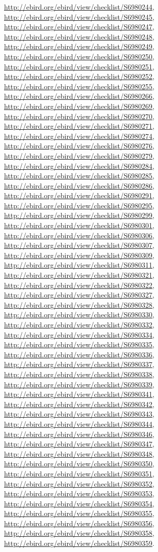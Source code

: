 \documentclass[9pt, article]{memoir}
\begin{document}
\begin{multicols}{2}
\url{http://ebird.org/ebird/view/checklist/S6980244}, 
\url{http://ebird.org/ebird/view/checklist/S6980245}, 
\url{http://ebird.org/ebird/view/checklist/S6980247}, 
\url{http://ebird.org/ebird/view/checklist/S6980248}, 
\url{http://ebird.org/ebird/view/checklist/S6980249}, 
\url{http://ebird.org/ebird/view/checklist/S6980250}, 
\url{http://ebird.org/ebird/view/checklist/S6980251}, 
\url{http://ebird.org/ebird/view/checklist/S6980252}, 
\url{http://ebird.org/ebird/view/checklist/S6980255}, 
\url{http://ebird.org/ebird/view/checklist/S6980266}, 
\url{http://ebird.org/ebird/view/checklist/S6980269}, 
\url{http://ebird.org/ebird/view/checklist/S6980270}, 
\url{http://ebird.org/ebird/view/checklist/S6980271}, 
\url{http://ebird.org/ebird/view/checklist/S6980274}, 
\url{http://ebird.org/ebird/view/checklist/S6980276}, 
\url{http://ebird.org/ebird/view/checklist/S6980279}, 
\url{http://ebird.org/ebird/view/checklist/S6980284}, 
\url{http://ebird.org/ebird/view/checklist/S6980285}, 
\url{http://ebird.org/ebird/view/checklist/S6980286}, 
\url{http://ebird.org/ebird/view/checklist/S6980291}, 
\url{http://ebird.org/ebird/view/checklist/S6980295}, 
\url{http://ebird.org/ebird/view/checklist/S6980299}, 
\url{http://ebird.org/ebird/view/checklist/S6980301}, 
\url{http://ebird.org/ebird/view/checklist/S6980306}, 
\url{http://ebird.org/ebird/view/checklist/S6980307}, 
\url{http://ebird.org/ebird/view/checklist/S6980309}, 
\url{http://ebird.org/ebird/view/checklist/S6980311}, 
\url{http://ebird.org/ebird/view/checklist/S6980321}, 
\url{http://ebird.org/ebird/view/checklist/S6980322}, 
\url{http://ebird.org/ebird/view/checklist/S6980327}, 
\url{http://ebird.org/ebird/view/checklist/S6980328}, 
\url{http://ebird.org/ebird/view/checklist/S6980330}, 
\url{http://ebird.org/ebird/view/checklist/S6980332}, 
\url{http://ebird.org/ebird/view/checklist/S6980334}, 
\url{http://ebird.org/ebird/view/checklist/S6980335}, 
\url{http://ebird.org/ebird/view/checklist/S6980336}, 
\url{http://ebird.org/ebird/view/checklist/S6980337}, 
\url{http://ebird.org/ebird/view/checklist/S6980338}, 
\url{http://ebird.org/ebird/view/checklist/S6980339}, 
\url{http://ebird.org/ebird/view/checklist/S6980341}, 
\url{http://ebird.org/ebird/view/checklist/S6980342}, 
\url{http://ebird.org/ebird/view/checklist/S6980343}, 
\url{http://ebird.org/ebird/view/checklist/S6980344}, 
\url{http://ebird.org/ebird/view/checklist/S6980346}, 
\url{http://ebird.org/ebird/view/checklist/S6980347}, 
\url{http://ebird.org/ebird/view/checklist/S6980348}, 
\url{http://ebird.org/ebird/view/checklist/S6980350}, 
\url{http://ebird.org/ebird/view/checklist/S6980351}, 
\url{http://ebird.org/ebird/view/checklist/S6980352}, 
\url{http://ebird.org/ebird/view/checklist/S6980353}, 
\url{http://ebird.org/ebird/view/checklist/S6980354}, 
\url{http://ebird.org/ebird/view/checklist/S6980355}, 
\url{http://ebird.org/ebird/view/checklist/S6980356}, 
\url{http://ebird.org/ebird/view/checklist/S6980358}, 
\url{http://ebird.org/ebird/view/checklist/S6980359}.


\end{multicols}
\end{document}
